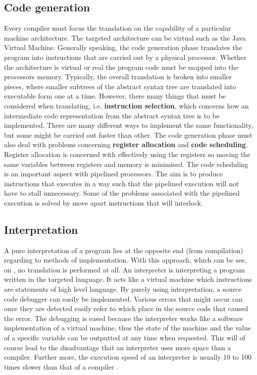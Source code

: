 \subsection{Code generation}
Every compiler must focus the translation on the capability of a particular machine architecture. The targeted architecture can be virtual such as the Java Virtual Machine. Generally speaking, the code generation phase translates the program into instructions that are carried out by a physical processor. Whether the architecture is virtual or real the program code must be mapped into the processors memory. Typically, the overall translation is broken into smaller pieces, where smaller subtrees of the abstract syntax tree are translated into executable form one at a time. However, there many things that must be considered when translating, i.e. \textbf{instruction selection}, which concerns how an intermediate code representation from the abstract syntax tree is to be implemented. There are many different ways to implement the same functionality, but some might be carried out faster than other. The code generation phase must also deal with problems concerning \textbf{register allocation} and \textbf{code scheduling}. Register allocation is concerned with effectively using the registers so moving the same variables between registers and memory is minimised\cite[p. 521]{fischer2009}. The code scheduling is an important aspect with pipelined processors. The aim is to produce instructions that executes in a way such that the pipelined execution will not have to stall unnecessary\cite[p. 551]{fischer2009}. Some of the problems associated with the pipelined execution is solved by move apart instructions that will interlock\cite[p. 552]{fischer2009}.

\subsection{Interpretation}
A pure interpretation of a program lies at the opposite end (from compilation) regarding to methods of implementation. With this approach, which can be see, on , no translation is performed at all. An interpreter is interpreting a program written in the targeted language. It acts like a virtual machine which instructions are statements of high level language. By purely using interpretation, a source code debugger can easily be implemented. Various errors that might occur can once they are detected easily refer to which place in the source code that caused the error. The debugging is eased because the interpreter works like a software implementation of a virtual machine, thus the state of the machine and the value of a specific variable can be outputted at any time when requested. This will of course lead to the disadvantage that an interpreter uses more space than a compiler. Further more, the execution speed of an interpreter is usually 10 to 100 times slower than that of a compiler \cite[p. 48]{sebesta2013}.

